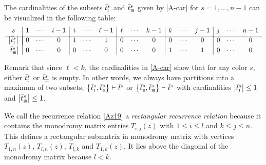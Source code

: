 \documentclass[10pt,a4paper]{amsart}
\newcommand{\so}{\scriptscriptstyle \rm I}
\newcommand{\st}{\scriptscriptstyle \rm I\hspace{-1pt}I}
\newcommand{\sth}{\scriptscriptstyle \rm I\hspace{-1pt}I\hspace{-1pt}I}
\newcommand{\bt}{{\bar t}}
\theoremstyle{definition}
\def\r#1{\eqref{#1}}
\begin{document}
The cardinalities of the subsets $\bt^s_{\so}$ and $\bt^s_{\sth}$ given by
\r{A-car} for $s=1,\dots,n-1$ can be visualized in the following table:
\begin{equation*}
\begin{array}{c|ccc|ccc|ccc|ccc|ccc}
s&1&\cdots&i-1&i&\cdots&\ell-1&\ell&\cdots&k-1&k&\cdots&j-1&j&\cdots&n-1\\[1mm]
\hline\\[-4.6mm]
\big|\bt^s_{\so}\big|&0&\cdots&0&1&\cdots&1&0&\cdots&0&0&\cdots&0&0&\cdots&0\\[1mm]
\big|\bt^s_{\sth}\big|&0&\cdots&0&0&\cdots&0&0&\cdots&0&1&\cdots&1&0&\cdots&0
\end{array}
\end{equation*}


Remark that since $\ell<k$, the cardinalities in \eqref{A-car} show that for any color $s$, either $\bt^s_{\so}$ or $\bt^s_{\sth}$ is empty.
In other words, we always have partitions into a maximum of two subsets,
$ \bigl\{\bt^s_{\so},\bt^s_{\st}\bigr\}\vdash \bt^s$ or
$\bigl\{\bt^s_{\st},\bt^s_{\sth}\bigr\}\vdash \bt^s$
with cardinalities $\big|\bt^s_{\so}\big|\leq1$ and $\big|\bt^s_{\sth}\big|\leq1$.

We call the recurrence relation \r{Az19} a {\it rectangular recurrence relation} because
it contains the monodromy matrix entries $T_{i,j}(z)$ with $1\leq i\leq l$ and $k\leq j\leq n$.
This defines a rectangular submatrix in monodromy matrix with
vertices $T_{1,n}(z)$, $T_{l,n}(z)$, $T_{l,k}$ and $T_{1,k}(z)$. It lies above the diagonal of the monodromy matrix because $l<k$.
\end{document}
